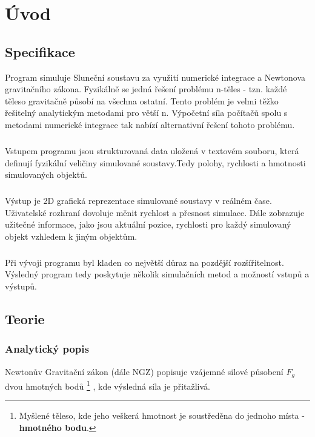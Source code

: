 
\chapter{Úvod}
\label{chap:uvod}

\section{Specifikace}
Program simuluje Sluneční soustavu za využití numerické integrace a Newtonova gravitačního zákona. Fyzikálně se jedná řešení problému n-těles - tzn. každé těleso gravitačně působí na všechna ostatní. Tento problém je velmi těžko řešitelný analytickým metodami pro větší n. Výpočetní síla počítačů spolu s metodami numerické integrace tak nabízí alternativní řešení tohoto problému.

\paragraph{}
Vstupem programu jsou strukturovaná data uložená v textovém souboru, která definují fyzikální veličiny simulované soustavy.Tedy polohy, rychlosti a hmotnosti simulovaných objektů. 
\paragraph{}
Výstup je 2D grafická reprezentace simulované soustavy v reálném čase. Uživatelské rozhraní dovoluje měnit rychlost a přesnost simulace. Dále zobrazuje užitečné informace, jako jsou aktuální pozice, rychlosti pro každý simulovaný objekt vzhledem k jiným objektům.
\paragraph{}
Při vývoji programu byl kladen co největší důraz na pozdější rozšířitelnost. Výsledný program tedy poskytuje několik simulačních metod a možností vstupů a výstupů. 

\section{Teorie}
\subsection{Analytický popis}
Newtonův Gravitační zákon (dále NGZ) popisuje vzájemné silové působení $ {F}_g $ dvou hmotných bodů
\footnote{Myšlené těleso, kde jeho veškerá hmotnost je soustředěna do jednoho místa - \textbf{hmotného bodu}. }
, kde výsledná síla je přitažlivá.

